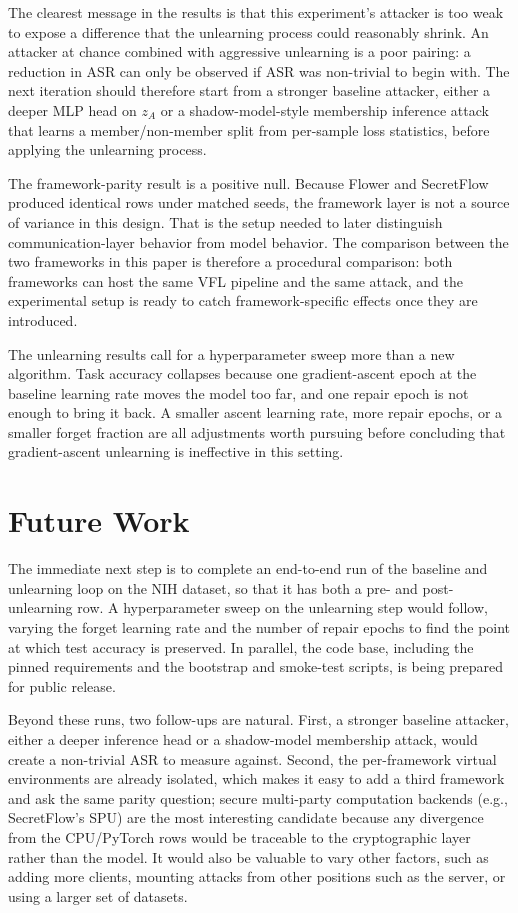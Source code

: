 \documentclass[sigconf,anonymous]{acmart}
\begin{document}
The clearest message in the results is that this experiment's attacker is too weak to expose a difference that the unlearning process could reasonably shrink. An attacker at chance combined with aggressive unlearning is a poor pairing: a reduction in ASR can only be observed if ASR was non-trivial to begin with. The next iteration should therefore start from a stronger baseline attacker, either a deeper MLP head on $z_A$ or a shadow-model-style membership inference attack that learns a member/non-member split from per-sample loss statistics, before applying the unlearning process.

The framework-parity result is a positive null. Because Flower and SecretFlow produced identical rows under matched seeds, the framework layer is not a source of variance in this design. That is the setup needed to later distinguish communication-layer behavior from model behavior. The comparison between the two frameworks in this paper is therefore a procedural comparison: both frameworks can host the same VFL pipeline and the same attack, and the experimental setup is ready to catch framework-specific effects once they are introduced.

The unlearning results call for a hyperparameter sweep more than a new algorithm. Task accuracy collapses because one gradient-ascent epoch at the baseline learning rate moves the model too far, and one repair epoch is not enough to bring it back. A smaller ascent learning rate, more repair epochs, or a smaller forget fraction are all adjustments worth pursuing before concluding that gradient-ascent unlearning is ineffective in this setting.

\section{Future Work}

The immediate next step is to complete an end-to-end run of the baseline and unlearning loop on the NIH dataset, so that it has both a pre- and post-unlearning row. A hyperparameter sweep on the unlearning step would follow, varying the forget learning rate and the number of repair epochs to find the point at which test accuracy is preserved. In parallel, the code base, including the pinned requirements and the bootstrap and smoke-test scripts, is being prepared for public release.

Beyond these runs, two follow-ups are natural. First, a stronger baseline attacker, either a deeper inference head or a shadow-model membership attack, would create a non-trivial ASR to measure against. Second, the per-framework virtual environments are already isolated, which makes it easy to add a third framework and ask the same parity question; secure multi-party computation backends (e.g., SecretFlow's SPU) are the most interesting candidate because any divergence from the CPU/PyTorch rows would be traceable to the cryptographic layer rather than the model. It would also be valuable to vary other factors, such as adding more clients, mounting attacks from other positions such as the server, or using a larger set of datasets.
\end{document}
